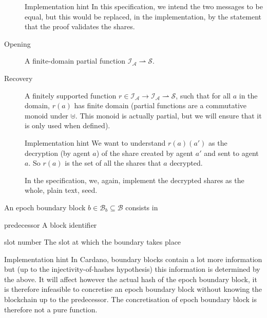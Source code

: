 \documentclass{article}
\newenvironment{record}{\begin{description}[font=\it]}{\end{description}}
\newenvironment{implementationhint}{\begin{bclogo}[noborder=true,
    logo=\bccrayon, epBarre=3, couleurBarre=PineGreen]{Implementation hint}}{\end{bclogo}}
\newcommand{\idsof}[1]{\mathcal{I}\!_#1}
\newcommand{\blocks}{\mathcal{B}}
\newcommand{\bblocks}{\mathcal{B}_b}
\newcommand{\agentids}{\idsof{\mathcal{A}}}
\newcommand{\seeds}{\mathcal{S}}
\begin{document}
\begin{description}
\begin{record}
\begin{description}
\begin{implementationhint}
        In this specification, we intend the two messages to be equal,
        but this would be replaced, in the implementation, by the
        statement that the proof validates the shares.
      \end{implementationhint}
    \item[Opening] A finite-domain partial function $\agentids⇀\seeds$.
    \item[Recovery] A finitely supported function
      $r∈\agentids→\agentids⇀\seeds$, such that for all $a$ in the
      domain, $r(a)$ has finite domain (partial functions are a commutative monoid
      under $⊎$. This monoid is actually partial, but we will ensure
      that it is only used when defined).

      \begin{implementationhint}
        We want to understand $r(a)(a')$ as the decryption (by agent $a$) of the
        share created by agent $a'$ and sent to agent $a$. So $r(a)$ is the set
        of all the shares that $a$ decrypted.

        In the specification, we, again, implement the decrypted
        shares as the whole, plain text, seed.
      \end{implementationhint}
    \end{description}

  \end{record}
\item[Epoch boundary blocks] An epoch boundary block
  $b∈\bblocks⊆\blocks$ consists in
  \begin{record}
  \item[predecessor] A block identifier
  \item[slot number] The slot at which the boundary takes place
  \end{record}

  \begin{implementationhint}
    In Cardano, boundary blocks contain a lot more information but (up
    to the injectivity-of-hashes hypothesis) this information is
    determined by the above. It will affect however the actual hash of
    the epoch boundary block, it is therefore infeasible to concretise
    an epoch boundary block without knowing the blockchain up to the
    predecessor. The concretisation of epoch boundary block is
    therefore not a pure function.
  \end{implementationhint}

\end{description}
\end{document}
